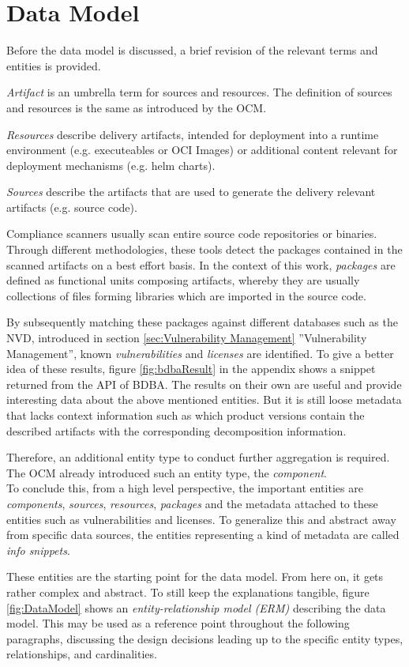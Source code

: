 \section{Data Model} \label{sec:Data Model}
Before the data model is discussed, a brief revision of the relevant terms and entities is provided.\par 
\emph{Artifact} is an umbrella term for sources and resources. The definition of sources and resources is the same as introduced by the OCM.\par 
\emph{Resources} describe delivery artifacts, intended for deployment into a runtime environment (e.g. executeables or OCI Images) or additional content relevant for deployment mechanisms (e.g. helm charts).\par
\emph{Sources} describe the artifacts that are used to generate the delivery relevant artifacts (e.g. source code).\par
Compliance scanners usually scan entire source code repositories or binaries. Through different methodologies, these tools detect the packages contained in the scanned artifacts on a best effort basis. In the context of this work, \emph{packages} are defined as functional units composing artifacts, whereby they are usually collections of files forming libraries which are imported in the source code.\par
By subsequently matching these packages against different databases such as the NVD, introduced in section \ref{sec:Vulnerability Management} ''Vulnerability Management'', known \emph{vulnerabilities} and \emph{licenses} are identified. To give a better idea of these results, figure \ref{fig:bdbaResult} in the appendix shows a snippet returned from the API of BDBA. The results on their own are useful and provide interesting data about the above mentioned entities. But it is still loose metadata that lacks context information such as which product versions contain the described artifacts with the corresponding decomposition information.\par
Therefore, an additional entity type to conduct further aggregation is required. The OCM already introduced such an entity type, the \emph{component}.\\

To conclude this, from a high level perspective, the important entities are \emph{components}, \emph{sources}, \emph{resources}, \emph{packages} and the metadata attached to these entities such as vulnerabilities and licenses. To generalize this and abstract away from specific data sources, the entities representing a kind of metadata are called \emph{info snippets}.\par
These entities are the starting point for the data model. From here on, it gets rather complex and abstract. To still keep the explanations tangible, figure \ref{fig:DataModel} shows an \emph{entity-relationship model (ERM)} describing the data model. This may be used as a reference point throughout the following paragraphs, discussing the design decisions leading up to the specific entity types, relationships, and cardinalities.

